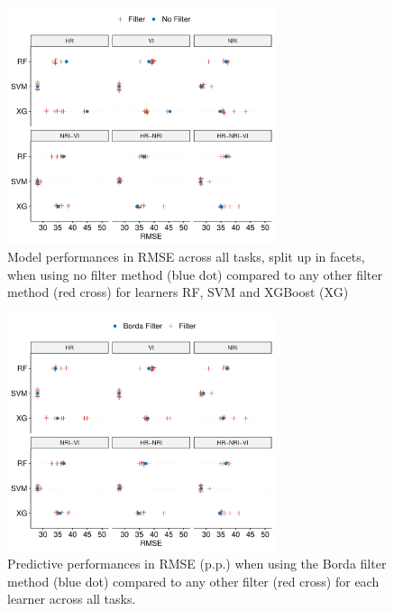 \documentclass[remotesensing,article,submit,moreauthors,pdftex]{Definitions/mdpi}
\begin{document}
\begin{figure} [t!]
	\centering
	\begin{center}
		\includegraphics[width=0.7\textwidth] {filter-effect-all-vs-no-filter-1.pdf}
		\caption{Model performances in RMSE across all tasks, split up in facets, when using no filter method (blue dot) compared to any other filter method (red cross) for learners RF, SVM and XGBoost (XG)}\label{fig:filter-effects-no-filter}
	\end{center}
\end{figure}

\begin{figure} [t!]
	\centering
	\begin{center}
		\includegraphics[width=0.7\textwidth] {filter-effect-all-vs-borda-filter-1.pdf}
		\caption{Predictive performances in RMSE (p.p.) when using the Borda filter method (blue dot) compared to any other filter (red cross) for each learner across all tasks.}\label{fig:filter-effects-borda}
	\end{center}
\end{figure}
\end{document}
